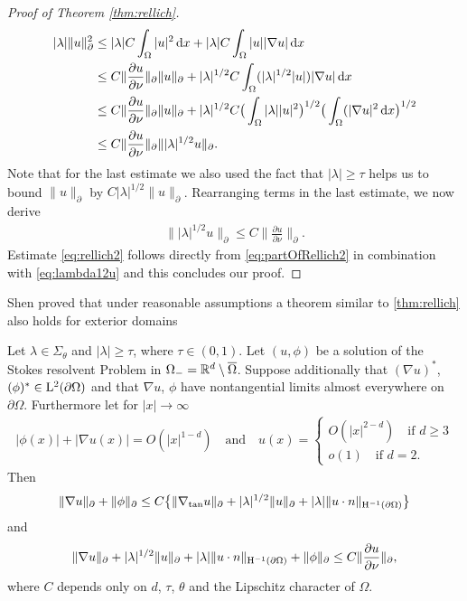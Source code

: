 \begin{proof}[Proof of Theorem \ref{thm:rellich}]
  \begin{align*}
    |\lambda| \|u\|_\partial^2 
    &\leq |\lambda| C \int_\Omega |u|^2 \, {\operatorname{d}\!{x}} + |\lambda| C \int_\Omega |u| |\nabla u| \, {\operatorname{d}\!{x}} \nonumber\\
    &\leq C \| \frac{\partial u}{\partial \nu} \|_\partial \|u\|_\partial + |\lambda|^{1/2} C \int_\Omega (|\lambda|^{1/2} |u|) |\nabla u| \, {\operatorname{d}\!{x}} \\
    &\leq C \|\frac{\partial u}{\partial \nu} \|_\partial \|u\|_\partial + |\lambda|^{1/2} C \big( \int_\Omega |\lambda| |u|^2 \big)^{1/2} \big( \int_\Omega (|\nabla u|^2 \, {\operatorname{d}\!{x}} \big)^{1/2} \\
    &\leq C \|\frac{\partial u}{\partial \nu} \|_\partial \||\lambda|^{1/2} u\|_\partial.
  \end{align*}
  Note that for the last estimate we also used the fact that $|\lambda| \geq \tau$ helps us to bound $\|u\|_\partial$ by $C |\lambda|^{1/2} \|u\|_\partial$.
  Rearranging terms in the last estimate, we now derive
  \begin{align}
    \label{eq:lambda12u}
    \| |\lambda|^{1/2} u\|_\partial \leq C \| \frac{\partial u}{\partial \nu} \|_\partial.
  \end{align}
  Estimate \eqref{eq:rellich2} follows directly from \eqref{eq:partOfRellich2} in combination with \eqref{eq:lambda12u} and this concludes our proof.
\end{proof}

Shen proved that under reasonable assumptions a theorem similar to \ref{thm:rellich} also holds for exterior domains

\begin{thm}
  \label{thm:rellichExterior}
  Let $\lambda \in \Sigma_\theta$ and $|\lambda| \geq \tau$, where $\tau \in (0,1)$.
  Let $(u,\phi)$ be a solution of the Stokes resolvent Problem in $\Omega_- = \mathbb{R}^d \setminus \overline\Omega$.
  Suppose additionally that $(\nabla u)^*$, $(\phi)^* \in \mathrm{L}^2(\partial\Omega)$ and that $\nabla u$, $\phi$ have nontangential limits almost everywhere on $\partial\Omega$.
  Furthermore let for $|x| \to \infty$
  \begin{align*}
    |\phi(x)| + |\nabla u(x)| = O(|x|^{1 - d}) \quad\text{and}\quad 
    u(x) = \begin{cases} O(|x|^{2 - d}) \quad\text{if } d \geq 3 \\ o(1) \quad\text{if } d = 2. \end{cases}
  \end{align*}
  Then
  \begin{align}
    \label{eq:rellich1ext}
    \|\nabla u\|_\partial + \|\phi\|_\partial
    \leq C \big\{ \|\nabla_{\mathrm{tan}} u\|_\partial + |\lambda|^{1/2} \|u\|_\partial + |\lambda| \|u \cdot n\|_{\mathrm{H}^{-1}(\partial\Omega)} \big\}
  \end{align}
  and
  \begin{align}
    \label{eq:rellich2ext}
    \|\nabla u\|_\partial + |\lambda|^{1/2} \|u\|_\partial + |\lambda| \|u \cdot n\|_{\mathrm{H}^{-1}(\partial\Omega)} + \|\phi\|_\partial
    \leq C \|\frac{\partial u}{\partial \nu} \|_\partial,
  \end{align}
  where $C$ depends only on $d$, $\tau$, $\theta$ and the Lipschitz character of $\Omega$.
\end{thm}
